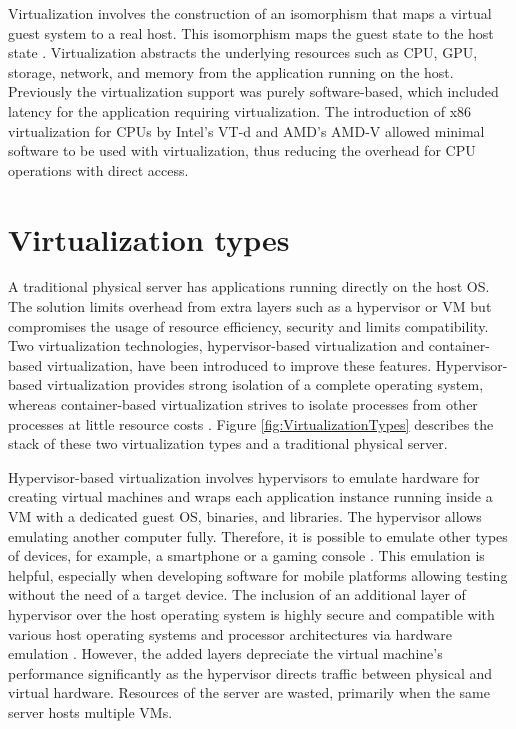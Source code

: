 Virtualization involves the construction of an isomorphism that maps a virtual guest system to a real host. This isomorphism maps the guest state to the host state \cite{Xing2012}. Virtualization abstracts the underlying resources such as CPU, GPU, storage, network, and memory from the application running on the host. Previously the virtualization support was purely software-based, which included latency for the application requiring virtualization. The introduction of x86 virtualization for CPUs by Intel's VT-d and AMD's AMD-V allowed minimal software to be used with virtualization, thus reducing the overhead for CPU operations with direct access.

\section{Virtualization types}

A traditional physical server has applications running directly on the host OS. The solution limits overhead from extra layers such as a hypervisor or VM but compromises the usage of resource efficiency, security and limits compatibility. Two virtualization technologies, hypervisor-based virtualization and container-based virtualization, have been introduced to improve these features. Hypervisor-based virtualization provides strong isolation of a complete operating system, whereas container-based virtualization strives to isolate processes from other processes at little resource costs \cite{Eder2016}. Figure \ref{fig:VirtualizationTypes} describes the stack of these two virtualization types and a traditional physical server.

Hypervisor-based virtualization involves hypervisors to emulate hardware for creating virtual machines and wraps each application instance running inside a VM with a dedicated guest OS, binaries, and libraries. The hypervisor allows emulating another computer fully. Therefore, it is possible to emulate other types of devices, for example, a smartphone or a gaming console \cite{Eder2016}. This emulation is helpful, especially when developing software for mobile platforms allowing testing without the need of a target device. The inclusion of an additional layer of hypervisor over the host operating system is highly secure and compatible with various host operating systems and processor architectures via hardware emulation \cite{Lingayat2018}. However, the added layers depreciate the virtual machine's performance significantly as the hypervisor directs traffic between physical and virtual hardware. Resources of the server are wasted, primarily when the same server hosts multiple VMs.

